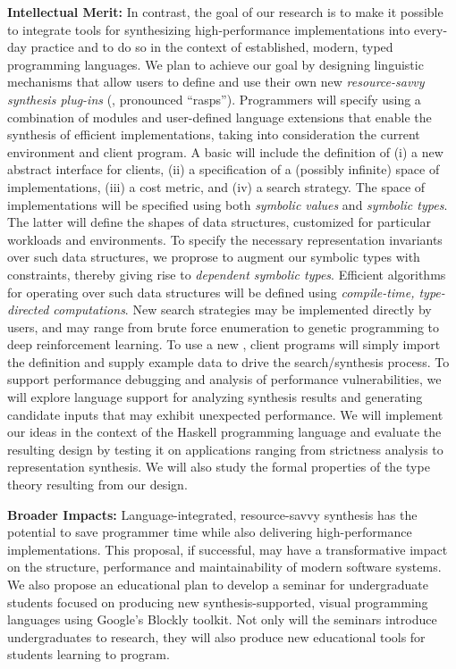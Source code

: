 \documentclass[12pt]{article}
\begin{document}
\noindent
\textbf{Intellectual Merit:}
In contrast, the goal of our research is to make it possible to integrate
tools for synthesizing high-performance implementations into every-day 
practice and to do so in the context of 
established, modern, typed programming languages.  
We plan to achieve our goal
by designing linguistic mechanisms that allow users to define and use 
their own new \emph{resource-savvy synthesis plug-ins} (\rasps,
pronounced ``rasps'').
Programmers will specify \rasps
using a combination of modules and user-defined
language extensions that enable the
synthesis of efficient implementations, taking into consideration the current
environment and client program.  A basic \rasp will include the definition
of (i) a new abstract interface for clients, (ii) a specification of a
(possibly infinite) space of implementations, (iii)
a cost metric, and (iv) a search strategy.  
The space of implementations
will be specified using both \emph{symbolic values} and \emph{symbolic types}.
The latter will define the shapes of data structures, customized for
particular workloads and environments.  To specify the necessary representation 
invariants over such data structures, we proprose to augment our
symbolic types with constraints, thereby giving rise to \emph{dependent
symbolic types}.
Efficient algorithms for operating over such data structures will be defined
using \emph{compile-time, type-directed computations}.  New 
search strategies may be implemented directly by users, and may range from
brute force enumeration to genetic programming to deep reinforcement learning.
To use a new \rasp, client programs will simply import the \rasp definition
and supply example data to drive the search/synthesis process.
To support performance debugging and analysis of performance vulnerabilities,
we will explore language support for analyzing synthesis 
results and generating candidate inputs that may exhibit unexpected 
performance.  We will implement our ideas in the context of the
Haskell programming language and evaluate the resulting design by testing
it on applications ranging from strictness analysis to
representation synthesis.  We will also study the formal properties of the
type theory resulting from our design.

\noindent
\textbf{Broader Impacts:} 
Language-integrated, resource-savvy synthesis has the potential to
save programmer time while also delivering high-performance implementations.
This proposal, if successful, may have a transformative impact on the
structure, performance and maintainability of modern software systems.
We also propose an educational plan to develop a seminar for 
undergraduate students focused on producing new synthesis-supported,
visual programming languages using Google's Blockly toolkit.  Not only
will the seminars introduce undergraduates to research, they will also
produce new educational tools for students learning to program.
\end{document}
